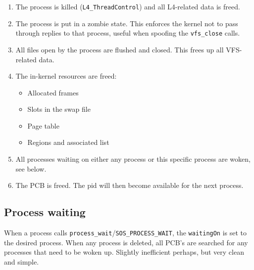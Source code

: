 \documentclass[12pt,english]{article}
\begin{document}
\begin{enumerate}
\item The process is killed (\texttt{L4\_ThreadControl}) and all L4-related data is freed.
\item The process is put in a zombie state.  This enforces the kernel not to pass through replies to that process, useful when spoofing the \texttt{vfs\_close} calls.
\item All files open by the process are flushed and closed.  This frees up all VFS-related data.
\item The in-kernel resources are freed:
\begin{itemize}
\item Allocated frames
\item Slots in the swap file
\item Page table
\item Regions and associated list
\end{itemize}
\item All processes waiting on either any process or this specific process are woken, see below.  
\item The PCB is freed.  The pid will then become available for the next process.
\end{enumerate}

\subsection{Process waiting}

When a process calls \texttt{process\_wait}/\texttt{SOS\_PROCESS\_WAIT}, the \texttt{waitingOn} is set to the desired process.  When any process is deleted, all PCB's are searched for any processes that need to be woken up.  Slightly inefficient perhaps, but very clean and simple.
\end{document}
